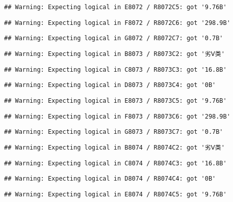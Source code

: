 \documentclass[
]{article}
\begin{document}
\begin{verbatim}
## Warning: Expecting logical in E8072 / R8072C5: got '9.76B'
\end{verbatim}

\begin{verbatim}
## Warning: Expecting logical in F8072 / R8072C6: got '298.9B'
\end{verbatim}

\begin{verbatim}
## Warning: Expecting logical in G8072 / R8072C7: got '0.7B'
\end{verbatim}

\begin{verbatim}
## Warning: Expecting logical in B8073 / R8073C2: got '劣Ⅴ类'
\end{verbatim}

\begin{verbatim}
## Warning: Expecting logical in C8073 / R8073C3: got '16.8B'
\end{verbatim}

\begin{verbatim}
## Warning: Expecting logical in D8073 / R8073C4: got '0B'
\end{verbatim}

\begin{verbatim}
## Warning: Expecting logical in E8073 / R8073C5: got '9.76B'
\end{verbatim}

\begin{verbatim}
## Warning: Expecting logical in F8073 / R8073C6: got '298.9B'
\end{verbatim}

\begin{verbatim}
## Warning: Expecting logical in G8073 / R8073C7: got '0.7B'
\end{verbatim}

\begin{verbatim}
## Warning: Expecting logical in B8074 / R8074C2: got '劣Ⅴ类'
\end{verbatim}

\begin{verbatim}
## Warning: Expecting logical in C8074 / R8074C3: got '16.8B'
\end{verbatim}

\begin{verbatim}
## Warning: Expecting logical in D8074 / R8074C4: got '0B'
\end{verbatim}

\begin{verbatim}
## Warning: Expecting logical in E8074 / R8074C5: got '9.76B'
\end{verbatim}
\end{document}
